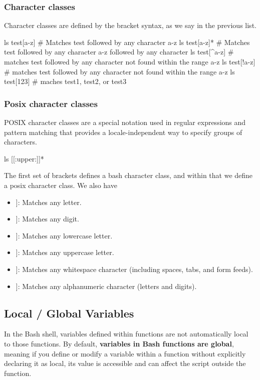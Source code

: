 \documentclass{report}
\begin{document}
    \subsubsection{Character classes}
    \bigbreak \noindent 
    Character classes are defined by the bracket syntax, as we say in the previous list.
    \bigbreak \noindent 
    \begin{bashcode}
        ls test[a-z] # Matches test followed by any character a-z
        ls test[a-z]* # Matches test followed by any character a-z followed by any character
        ls test[^a-z] # matches test followed by any character not found within the range a-z
        ls test[!a-z] # matches test followed by any character not found within the range a-z
        ls test[123] # maches test1, test2, or test3
    \end{bashcode}
    \bigbreak \noindent 
    \subsubsection{Posix character classes}
    \bigbreak \noindent 
    POSIX character classes are a special notation used in regular expressions and pattern matching that provides a locale-independent way to specify groups of characters. 
    \bigbreak \noindent 
    \begin{bashcode}
        ls [[:upper:]]* 
    \end{bashcode}
    \bigbreak \noindent 
    The first set of brackets defines a bash character class, and within that we define a posix character class. We also have
    \begin{itemize}
        \item \relax[[:alpha:]]: Matches any letter.
        \item \relax[[:digit:]]: Matches any digit.
        \item \relax[[:lower:]]: Matches any lowercase letter.
        \item \relax[[:upper:]]: Matches any uppercase letter.
        \item \relax[[:space:]]: Matches any whitespace character (including spaces, tabs, and form feeds).
        \item \relax[[:alnum:]]: Matches any alphanumeric character (letters and digits).
    \end{itemize}

    \pagebreak 
    \bigbreak \noindent 
    \subsection{Local / Global Variables}
    \bigbreak \noindent 
    \begin{concept}
        In the Bash shell, variables defined within functions are not automatically local to those functions. By default, \textbf{variables in Bash functions are global}, meaning if you define or modify a variable within a function without explicitly declaring it as local, its value is accessible and can affect the script outside the function. 
    \end{concept}
    \bigbreak \noindent 
\end{document}
